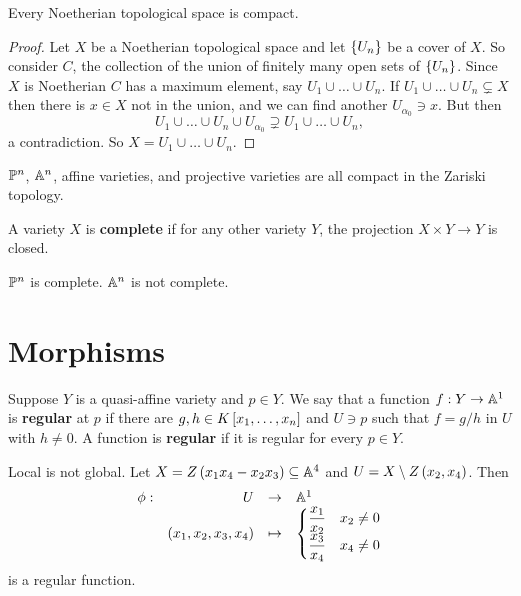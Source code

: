 
\begin{proposition}
Every Noetherian topological space is compact.
\end{proposition}

\begin{proof}
Let $ X $ be a Noetherian topological space and let $ \cb{U_n} $ be a cover of $ X $. So consider $ C $, the collection of the union of finitely many open sets of $ \cb{U_n} $. Since $ X $ is Noetherian $ C $ has a maximum element, say $ U_1 \cup \dots \cup U_n $. If $ U_1 \cup \dots \cup U_n \subsetneq X $ then there is $ x \in X $ not in the union, and we can find another $ U_{\alpha_0} \ni x $. But then
$$ U_1 \cup \dots \cup U_n \cup U_{\alpha_0} \supsetneq U_1 \cup \dots \cup U_n, $$
a contradiction. So $ X = U_1 \cup \dots \cup U_n $.
\end{proof}

\begin{corollary}
$ \P^n $, $ \A^n $, affine varieties, and projective varieties are all compact in the Zariski topology.
\end{corollary}

\begin{definition}
A variety $ X $ is \textbf{complete} if for any other variety $ Y $, the projection $ X \times Y \to Y $ is closed.
\end{definition}

\begin{example}
$ \P^n $ is complete. $ \A^n $ is not complete.
\end{example}

\pagebreak

\section{Morphisms}

\begin{definition}
Suppose $ Y $ is a quasi-affine variety and $ p \in Y $. We say that a function $ f : Y \to \A^1 $ is \textbf{regular} at $ p $ if there are $ g, h \in K\sb{x_1, \dots, x_n} $ and $ U \ni p $ such that $ f = g / h $ in $ U $ with $ h \ne 0 $. A function is \textbf{regular} if it is regular for every $ p \in Y $.
\end{definition}

\begin{example}
Local is not global. Let $ X = Z\rb{x_1x_4 - x_2x_3} \subseteq \A^4 $ and $ U = X \setminus Z\rb{x_2, x_4} $. Then
$$ \function[\phi]{U}{\A^1}{\rb{x_1, x_2, x_3, x_4}}{
\begin{cases}
\dfrac{x_1}{x_2} & x_2 \ne 0 \\
\dfrac{x_3}{x_4} & x_4 \ne 0
\end{cases}
} $$
is a regular function.
\end{example}

